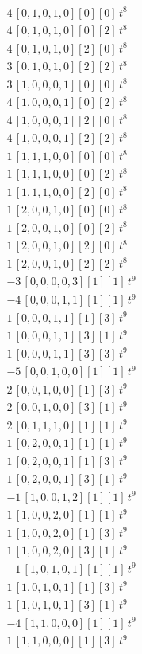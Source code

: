 \begin{align*}
4\,[0,1,0,1,0] [0] [0]\,t^{8} \\
4\,[0,1,0,1,0] [0] [2]\,t^{8} \\
4\,[0,1,0,1,0] [2] [0]\,t^{8} \\
3\,[0,1,0,1,0] [2] [2]\,t^{8} \\
3\,[1,0,0,0,1] [0] [0]\,t^{8} \\
4\,[1,0,0,0,1] [0] [2]\,t^{8} \\
4\,[1,0,0,0,1] [2] [0]\,t^{8} \\
4\,[1,0,0,0,1] [2] [2]\,t^{8} \\
1\,[1,1,1,0,0] [0] [0]\,t^{8} \\
1\,[1,1,1,0,0] [0] [2]\,t^{8} \\
1\,[1,1,1,0,0] [2] [0]\,t^{8} \\
1\,[2,0,0,1,0] [0] [0]\,t^{8} \\
1\,[2,0,0,1,0] [0] [2]\,t^{8} \\
1\,[2,0,0,1,0] [2] [0]\,t^{8} \\
1\,[2,0,0,1,0] [2] [2]\,t^{8} \\
-3\,[0,0,0,0,3] [1] [1]\,t^{9} \\
-4\,[0,0,0,1,1] [1] [1]\,t^{9} \\
1\,[0,0,0,1,1] [1] [3]\,t^{9} \\
1\,[0,0,0,1,1] [3] [1]\,t^{9} \\
1\,[0,0,0,1,1] [3] [3]\,t^{9} \\
-5\,[0,0,1,0,0] [1] [1]\,t^{9} \\
2\,[0,0,1,0,0] [1] [3]\,t^{9} \\
2\,[0,0,1,0,0] [3] [1]\,t^{9} \\
2\,[0,1,1,1,0] [1] [1]\,t^{9} \\
1\,[0,2,0,0,1] [1] [1]\,t^{9} \\
1\,[0,2,0,0,1] [1] [3]\,t^{9} \\
1\,[0,2,0,0,1] [3] [1]\,t^{9} \\
-1\,[1,0,0,1,2] [1] [1]\,t^{9} \\
1\,[1,0,0,2,0] [1] [1]\,t^{9} \\
1\,[1,0,0,2,0] [1] [3]\,t^{9} \\
1\,[1,0,0,2,0] [3] [1]\,t^{9} \\
-1\,[1,0,1,0,1] [1] [1]\,t^{9} \\
1\,[1,0,1,0,1] [1] [3]\,t^{9} \\
1\,[1,0,1,0,1] [3] [1]\,t^{9} \\
-4\,[1,1,0,0,0] [1] [1]\,t^{9} \\
1\,[1,1,0,0,0] [1] [3]\,t^{9} \\

\end{align*}

